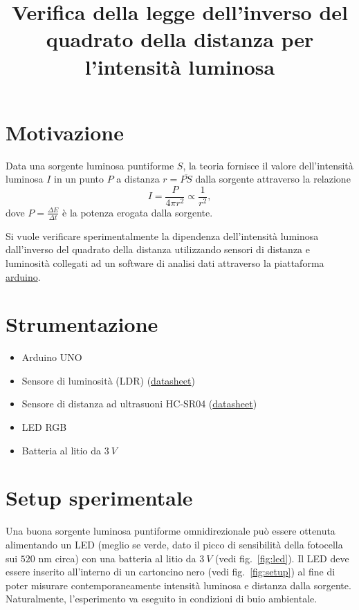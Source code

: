 \documentclass[11pt]{article}
\title{Verifica della legge dell'inverso del quadrato della distanza per l'intensit\`a luminosa}
\date{}
\author{}
\providecommand{\tightlist}{%
      \setlength{\itemsep}{0pt}\setlength{\parskip}{0pt}}
\begin{document}
    \maketitle





    \hypertarget{motivazione}{%
\section{Motivazione}\label{motivazione}}

Data una sorgente luminosa puntiforme \(S\), la teoria fornisce il
valore dell'intensità luminosa \(I\) in un punto \(P\) a distanza
\(r=\overline{PS}\) dalla sorgente attraverso la relazione
\[I=\frac{P}{4\pi r^2}\propto \frac{1}{r^2},\] dove
\(P=\frac{\Delta E}{\Delta t}\) è la potenza erogata dalla sorgente.

Si vuole verificare sperimentalmente la dipendenza dell'intensità
luminosa dall'inverso del quadrato della distanza utilizzando sensori di
distanza e luminosità collegati ad un software di analisi dati
attraverso la piattaforma \href{https://www.arduino.cc/}{arduino}.

    \hypertarget{strumentazione}{%
\section{Strumentazione}\label{strumentazione}}

\begin{itemize}
\tightlist
\item
  Arduino UNO
\item
  Sensore di luminosità (LDR)
  (\href{https://cdn-learn.adafruit.com/downloads/pdf/photocells.pdf}{datasheet})
\item
  Sensore di distanza ad ultrasuoni HC-SR04
  (\href{https://www.electroschematics.com/wp-content/uploads/2013/07/HCSR04-datasheet-version-1.pdf}{datasheet})
\item
  LED RGB
\item
  Batteria al litio da \(3\:V\)
\end{itemize}

    \hypertarget{setup-sperimentale}{%
\section{Setup sperimentale}\label{setup-sperimentale}}

Una buona sorgente luminosa puntiforme omnidirezionale può essere
ottenuta alimentando un LED (meglio se verde, dato il picco di sensibilit\`a della fotocella sui $520$ nm circa) con una batteria al litio
da \(3\: V\) (vedi fig.~\ref{fig:led}). Il LED deve essere inserito all'interno di un cartoncino
nero (vedi fig.~\ref{fig:setup}) al fine di poter misurare contemporaneamente
intensità luminosa e distanza dalla sorgente. Naturalmente,
l'esperimento va eseguito in condizioni di buio ambientale.
\end{document}
